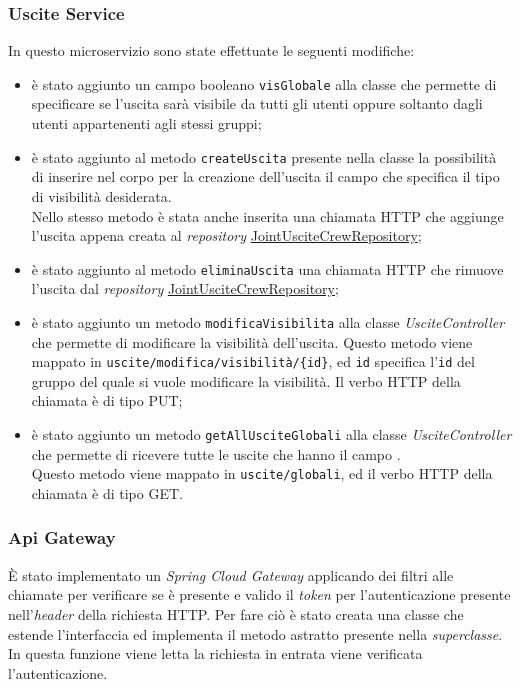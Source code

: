 \subsubsection{Uscite Service}
In questo \gls{microservizio} sono state effettuate le seguenti modifiche: 
\begin{itemize}
    \item è stato aggiunto un campo booleano \texttt{visGlobale} alla classe  che permette di specificare se l'uscita sarà visibile da tutti gli utenti oppure soltanto dagli utenti appartenenti agli stessi gruppi;
    \item è stato aggiunto al metodo \texttt{createUscita} presente nella classe  la possibilità di inserire nel corpo per la creazione dell'uscita il campo che specifica il tipo di visibilità desiderata. \\
    Nello stesso metodo è stata anche inserita una chiamata HTTP che aggiunge l'uscita appena creata al \textit{repository} \hyperref[JointUsciteCrewRepository]{JointUsciteCrewRepository};
    \item è stato aggiunto al metodo \texttt{eliminaUscita} una chiamata HTTP che rimuove l'uscita dal \textit{repository} \hyperref[JointUsciteCrewRepository]{JointUsciteCrewRepository};
    \item è stato aggiunto un metodo \texttt{modificaVisibilita}  alla classe \textit{UsciteController} che permette di modificare la visibilità dell'uscita.
    Questo metodo viene mappato in \texttt{uscite/modifica/visibilità/\{id\}}, ed \texttt{id} specifica l'\texttt{id} del gruppo del quale si vuole modificare la visibilità. Il verbo HTTP della chiamata è di tipo PUT; 
    \item è stato aggiunto un metodo \texttt{getAllUsciteGlobali}  alla classe \textit{UsciteController} che permette di ricevere tutte le uscite che hanno il campo . \\
    Questo metodo viene mappato in \texttt{uscite/globali}, ed il verbo HTTP della chiamata è di tipo GET.
\end{itemize}


\subsubsection{Api Gateway}
È stato implementato un \textit{Spring Cloud Gateway} applicando dei filtri alle chiamate per verificare se è presente e valido il \textit{token} per l'autenticazione  presente nell'\textit{header} della richiesta HTTP.
Per fare ciò è stato creata una classe  che estende l'interfaccia  ed implementa il metodo astratto  presente nella \textit{superclasse}. In questa funzione viene letta la richiesta in entrata viene verificata l'autenticazione.

